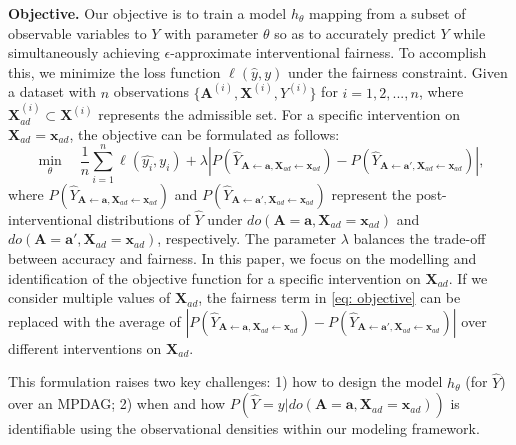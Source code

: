 \documentclass{article} %
\begin{document}
\textbf{Objective.} Our objective is to train a model $h_\theta$ mapping from a subset of observable variables to $Y$ with parameter $\theta$ so as to accurately predict $Y$ while simultaneously achieving $\epsilon$-approximate interventional fairness. To accomplish this, we minimize the loss function $\ell (\hat{y}, y)$ under the fairness constraint. Given a dataset with $n$ observations $\{\mathbf{A}^{(i)}, \mathbf{X}^{(i)}, Y^{(i)} \}$ for $i=1,2,...,n$, where $\mathbf{X}^{(i)}_{ad} \subset \mathbf{X}^{(i)}$ represents the admissible set. For a specific intervention on $\mathbf{X}_{ad}=\mathbf{x}_{ad}$, the objective can be formulated as follows:
\begin{equation}\label{eq: objective}
    \min_{\theta} \quad \frac{1}{n} \sum_{i=1}^{n} \ell (\hat{y_i}, y_i) + \lambda |P(\hat{Y}_{\mathbf{A}\leftarrow \mathbf{a}, \mathbf{X}_{ad} \leftarrow \mathbf{x}_{ad}}) - P(\hat{Y}_{\mathbf{A}\leftarrow \mathbf{a'}, \mathbf{X}_{ad} \leftarrow \mathbf{x}_{ad}})|,
\end{equation}
where $P(\hat{Y}_{\mathbf{A}\leftarrow \mathbf{a}, \mathbf{X}_{ad} \leftarrow \mathbf{x}_{ad}})$ and $P(\hat{Y}_{\mathbf{A}\leftarrow \mathbf{a'}, \mathbf{X}_{ad} \leftarrow \mathbf{x}_{ad}})$ represent the post-interventional distributions of $\hat{Y}$ under $do(\mathbf{A}=\mathbf{a}, \mathbf{X}_{ad}=\mathbf{x}_{ad})$ and $do(\mathbf{A}=\mathbf{a'}, \mathbf{X}_{ad}=\mathbf{x}_{ad})$, respectively. The parameter $\lambda$ balances the trade-off between accuracy and fairness. In this paper, we focus on the modelling and identification of the objective function for a specific intervention on $\mathbf{X}_{ad}$. If we consider multiple values of $\mathbf{X}_{ad}$, the fairness term in \cref{eq: objective} can be replaced with the average of $|P(\hat{Y}_{\mathbf{A}\leftarrow \mathbf{a}, \mathbf{X}_{ad} \leftarrow \mathbf{x}_{ad}}) - P(\hat{Y}_{\mathbf{A}\leftarrow \mathbf{a'}, \mathbf{X}_{ad} \leftarrow \mathbf{x}_{ad}})|$ over different interventions on $\mathbf{X}_{ad}$.

This formulation raises two key challenges: 1) how to design the model $h_\theta$ (for $\hat{Y}$) over an MPDAG; 2) when and how $P(\hat{Y}=y|do(\mathbf{A}=\mathbf{a}, \mathbf{X}_{ad}=\mathbf{x}_{ad}))$ is identifiable using the observational densities within our modeling framework.
\end{document}
